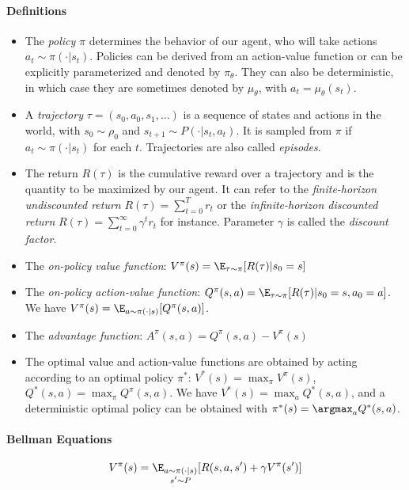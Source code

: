 \paragraph{Definitions}
\begin{itemize}
    \item The \emph{policy} $\pi$ determines the behavior of our agent, who will take actions $a_t \sim \pi(\cdot | s_t)$. Policies can be derived from an action-value function or can be explicitly parameterized and denoted by $\pi_{\theta}$. They can also be deterministic, in which case they are sometimes denoted by $\mu_{\theta}$, with $a_t = \mu_{\theta}(s_t)$.
    \item A \emph{trajectory} $\tau = (s_0, a_0, s_1, \dots)$ is a sequence of states and actions in the world, with $s_0 \sim \rho_0$ and $s_{t+1} \sim P(\cdot | s_t, a_t)$. It is sampled from $\pi$ if $a_t \sim \pi(\cdot | s_t)$ for each $t$. Trajectories are also called \emph{episodes}.
    \item The return $R(\tau)$ is the cumulative reward over a trajectory and is the quantity to be maximized by our agent. It can refer to the \emph{finite-horizon undiscounted return} $R(\tau) = \sum_{t=0}^T r_t$ or the \emph{infinite-horizon discounted return} $R(\tau) = \sum_{t=0}^{\infty} \gamma^t r_t$ for instance. Parameter $\gamma$ is called the \emph{discount factor}.
    \item The \emph{on-policy value function}: $V^{\pi}(s) = \E_{\tau \sim \pi}[R(\tau) | s_0=s]$
    \item The \emph{on-policy action-value function}: $Q^{\pi}(s,a) = \E_{\tau \sim \pi}[R(\tau) | s_0=s, a_0=a]$. We have $V^{\pi}(s) = \E_{a \sim \pi(\cdot | s)}[Q^\pi(s,a)]$.
    \item The \emph{advantage function}: $A^\pi(s,a) = Q^\pi(s,a) - V^\pi(s)$
    \item The optimal value and action-value functions are obtained by acting according to an optimal policy $\pi^*$: $V^*(s) = \max_{\pi} V^{\pi}(s)$, $Q^*(s,a) = \max_{\pi} Q^{\pi}(s,a)$. We have $V^*(s) = \max_a Q^*(s,a)$, and a deterministic optimal policy can be obtained with $\pi^*(s) = \argmax_a Q^*(s,a)$.
\end{itemize}

\paragraph{Bellman Equations}
\begin{equation}
    V^{\pi}(s) = \E_{\substack{a \sim \pi(\cdot | s) \\ s' \sim P}}[R(s, a, s') + \gamma V^{\pi}(s')]
\label{eq:bellman-v}
\end{equation}

